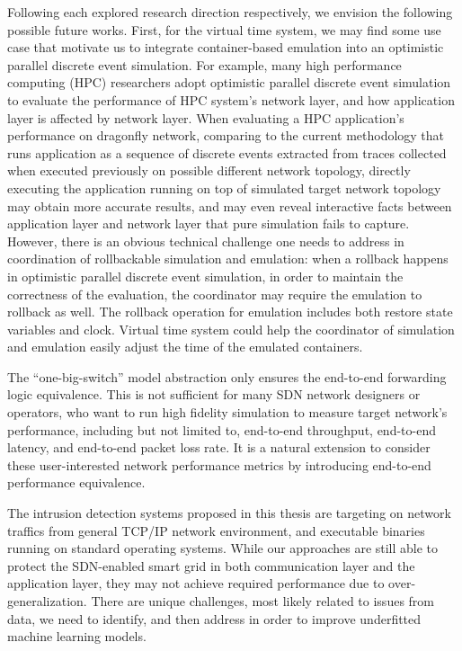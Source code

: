Following each explored research direction respectively, we envision the following possible future works.
First, for the virtual time system, we may find some use case that motivate us to integrate container-based emulation into an optimistic parallel discrete event simulation.
For example, many high performance computing (HPC) researchers adopt optimistic parallel discrete event simulation~\cite{CodesSim}
to evaluate the performance of HPC system's network layer, and how application layer is affected by network layer.
When evaluating a HPC application's performance on dragonfly network,
comparing to the current methodology that runs application as a sequence of discrete events extracted from traces collected when executed previously on possible different network topology,
directly executing the application running on top of simulated target network topology may obtain more accurate results,
and may even reveal interactive facts between application layer and network layer that pure simulation fails to capture.
However, there is an obvious technical challenge one needs to address in coordination of rollbackable simulation and emulation:
when a rollback happens in optimistic parallel discrete event simulation, in order to maintain the correctness of the evaluation,
the coordinator may require the emulation to rollback as well.
The rollback operation for emulation includes both restore state variables and clock.
Virtual time system could help the coordinator of simulation and emulation easily adjust the time of the emulated containers.

The ``one-big-switch'' model abstraction only ensures the end-to-end forwarding logic equivalence.
This is not sufficient for many SDN network designers or operators, who want to run high fidelity simulation to measure target network's performance,
including but not limited to, end-to-end throughput, end-to-end latency, and end-to-end packet loss rate.
It is a natural extension to consider these user-interested network performance metrics by introducing end-to-end performance equivalence.

The intrusion detection systems proposed in this thesis are targeting on network traffics from general TCP/IP network environment,
and executable binaries running on standard operating systems.
While our approaches are still able to protect the SDN-enabled smart grid in both communication layer and the application layer,
they may not achieve required performance due to over-generalization.
There are unique challenges, most likely related to issues from data,
we need to identify, and then address in order to improve underfitted machine learning models.

